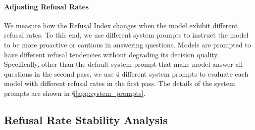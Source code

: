 \documentclass{article} %
\theoremstyle{definition}
\begin{document}
\paragraph{Adjusting Refusal Rates} We measure how the Refusal Index changes when the model exhibit different refusal rates. 
To this end, we use different system prompts to instruct the model to be more proactive or cautious in answering questions. 
Models are prompted to have different refusal tendencies without degrading its decision quality. 
Specifically, other than the default system prompt that make model answer all questions in the second pass, we use 4 different system prompts to evaluate each model with different refusal rates in the first pass. The details of the system prompts are shown in \S\ref{app:system_prompts}.


\subsection{Refusal Rate Stability Analysis}
\label{sec:validating_latent_uncertainty_model}
\end{document}
